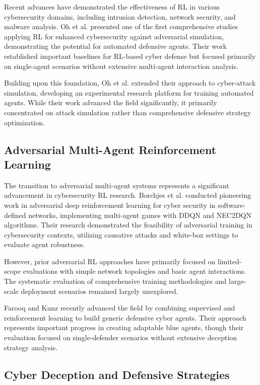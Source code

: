 \documentclass[11pt]{article}
\theoremstyle{definition}
\theoremstyle{plain}
\begin{document}
Recent advances have demonstrated the effectiveness of RL in various cybersecurity domains, including intrusion detection, network security, and malware analysis. Oh et al. \cite{oh2023applying} presented one of the first comprehensive studies applying RL for enhanced cybersecurity against adversarial simulation, demonstrating the potential for automated defensive agents. Their work established important baselines for RL-based cyber defense but focused primarily on single-agent scenarios without extensive multi-agent interaction analysis.

Building upon this foundation, Oh et al. \cite{oh2024employing} extended their approach to cyber-attack simulation, developing an experimental research platform for training automated agents. While their work advanced the field significantly, it primarily concentrated on attack simulation rather than comprehensive defensive strategy optimization.

\subsection{Adversarial Multi-Agent Reinforcement Learning}

The transition to adversarial multi-agent systems represents a significant advancement in cybersecurity RL research. Borchjes et al. \cite{borchjes2023adversarial} conducted pioneering work in adversarial deep reinforcement learning for cyber security in software-defined networks, implementing multi-agent games with DDQN and NEC2DQN algorithms. Their research demonstrated the feasibility of adversarial training in cybersecurity contexts, utilizing causative attacks and white-box settings to evaluate agent robustness.

However, prior adversarial RL approaches have primarily focused on limited-scope evaluations with simple network topologies and basic agent interactions. The systematic evaluation of comprehensive training methodologies and large-scale deployment scenarios remained largely unexplored.

Farooq and Kunz \cite{farooq2025combining} recently advanced the field by combining supervised and reinforcement learning to build generic defensive cyber agents. Their approach represents important progress in creating adaptable blue agents, though their evaluation focused on single-defender scenarios without extensive deception strategy analysis.

\subsection{Cyber Deception and Defensive Strategies}
\end{document}
